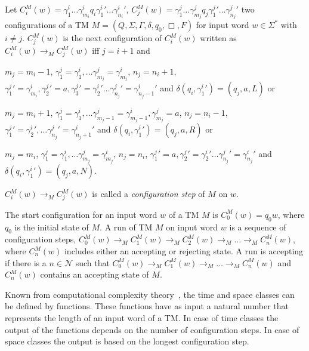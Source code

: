 \begin{definition}
    Let $C_i^M(w) = \gamma_1^i\dots\gamma_{m_i}^i{q_i}{\gamma_1^i}'\dots{\gamma_{n_i}^i}'$, $C_j^M(w) =
    \gamma_1^j\dots\gamma_{m_j}^j{q_j}{\gamma_1^j}'\dots{\gamma_{n_j}^j}'$ two configurations of a TM $M = (Q, \Sigma,
    \Gamma,
    \delta, q_0, \Box, F)$ for input word $w \in \Sigma^*$ with $i \neq j$. $C_j^M(w)$ is the next configuration
    of $C_i^M(w)$ written as $C_i^M(w) \rightarrow_M C_j^M(w)$ iff $j = i + 1$ and
    \begin{compactitem}
        \item $m_j = m_i - 1$, $\gamma_1^j = \gamma_1^i, \dots \gamma_{m_j}^j = \gamma_{m_j}^i$, $n_j = n_i + 1$,
        ${\gamma_1^j}' = \gamma_{m_i}^i, {\gamma_2^j}' = a, {\gamma_3^j}' = {\gamma_2^i}' \dots {\gamma_{n_j}^j}' =
        {\gamma_{{n_j}- 1}^i}'$ and $\delta(q_i, {\gamma_1^i}') = (q_j, a, L)$ or
        \item $m_j = m_i + 1$, $\gamma_1^j = \gamma_1^i, \dots \gamma_{m_j-1}^j = \gamma_{m_j-1}^i, \gamma_{m_j}^j
        = a$, $n_j = n_i - 1$, ${\gamma_1^j}' = {\gamma_2^i}', \dots {\gamma_{n_j}^j}' = {\gamma_{{n_j}+1}^i}'$ and
$\delta (q_i, {\gamma_1^i}') = (q_j, a, R)$ or
        \item $m_j = m_i$, $\gamma_1^j = \gamma_1^i, \dots \gamma_{m_j}^j = \gamma_{m_j}^i$, $n_j = n_i$, ${\gamma_1^j}'
= a, {\gamma_2^j}' = {\gamma_2^i}' \dots {\gamma_{n_j}^j}' = {\gamma_{n_j}^i}'$ and $\delta
        (q_i, {\gamma_1^i}') = (q_j, a, N)$.
    \end{compactitem}
    $C_i^M(w) \rightarrow_M C_j^M(w)$ is called a \emph{configuration step} of $M$ on $w$.
\end{definition}

The start configuration for an input word $w$ of a TM $M$ is $C_0^M(w) = q_0w$, where $q_0$ is the initial state of
$M$. A run of TM $M$ on input word $w$ is a sequence of configuration steps, $C_0^M(w) \rightarrow_M C_1^M(w)
\rightarrow_M C_2^M(w) \rightarrow_M \dots \rightarrow_M C_n^M(w)$, where $C_n^M(w)$ includes either an accepting or
rejecting state. A run is accepting if there is a $n \in \mathcal{N}$ such that $C_0^M(w) \rightarrow_M C_1^M(w)
\rightarrow_M \dots \rightarrow_M C_n^M(w)$ and $C_n^M(w)$ contains an accepting state of $M$.

Known from computational complexity theory~\cite{papadimitriou1994complexity}, the time and space classes
can be defined by functions. These functions have as input a natural number that represents the length of an input
word of a TM. In case of time classes the output of the functions depends on the number of configuration steps. In
case of space classes the output is based on the longest configuration step.

